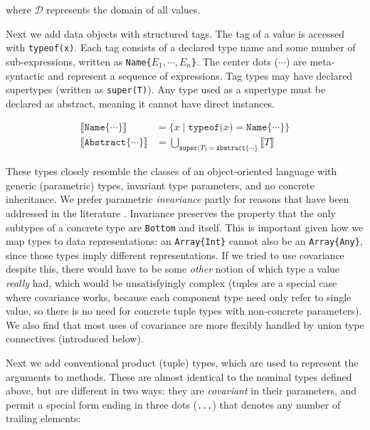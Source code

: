 \noindent
where $\mathcal{D}$ represents the domain of all values.

Next we add data objects with structured tags.
The tag of a value is accessed with \texttt{typeof(x)}.
Each tag consists of a declared type name and some number of sub-expressions,
written as \texttt{Name\{}$E_1, \cdots, E_n$\texttt{\}}.
The center dots ($\cdots$) are meta-syntactic and represent a sequence of expressions.
Tag types may have declared supertypes (written as \texttt{super(T)}).
Any type used as a supertype must be declared as abstract, meaning it
cannot have direct instances.

\vspace{-3ex}
\begin{align*}
  \llbracket \texttt{Name\{}\cdots\texttt{\}} \rrbracket &= \{ x\mid \texttt{typeof(}x\texttt{)} = \texttt{Name\{}\cdots\texttt{\}} \} \\
  \llbracket \texttt{Abstract\{}\cdots\texttt{\}} \rrbracket &= \bigcup_{\texttt{super(}T\texttt{)} = \texttt{Abstract\{}\cdots\texttt{\}}} \llbracket T \rrbracket
\end{align*}

These types closely resemble the classes of an object-oriented language with
generic (parametric) types, invariant type parameters, and no concrete inheritance.
We prefer parametric \emph{invariance} partly for reasons that have been addressed in the
literature \cite{Day:1995:SVC:217838.217852}.
Invariance preserves the property that the only subtypes of a concrete type are \texttt{Bottom}
and itself.
This is important given how we map types to data representations: an \texttt{Array\{Int\}}
cannot also be an \texttt{Array\{Any\}}, since those types imply different
representations.
If we tried to use covariance despite this, there would have to be some \emph{other}
notion of which type a value \emph{really} had, which would be unsatisfyingly
complex
(tuples are a special case where covariance works, because each component type need
only refer to single value, so there is no need for concrete
tuple types with non-concrete parameters).
We also find that most uses of covariance are more flexibly
handled by union type connectives (introduced below).

Next we add conventional product (tuple) types, which are used to represent the
arguments to methods. These are almost identical to the nominal types defined above,
but are different in two ways: they are \emph{covariant} in their parameters, and permit
a special form ending in three dots (\texttt{...}) that denotes any number of trailing
elements:

